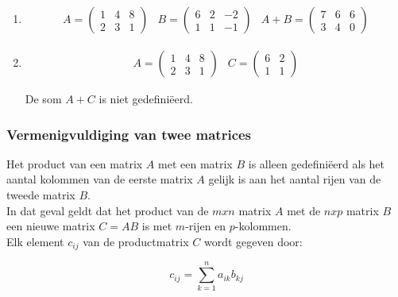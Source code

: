 \begin{enumerate}
	\item 
\[
\begin{array}{lll}
A= \left( \begin{matrix}
1 & 4 & 8 \\
2 & 3 & 1
\end{matrix} \right) &
B= \left( \begin{matrix}
6 & 2 & -2 \\
1 & 1 & -1 
\end{matrix} \right) &
A+B=\left( \begin{matrix}
7 & 6 & 6 \\
3 & 4 & 0
\end{matrix} \right)
\end{array}
\]
	\item
\[ 
\begin{array}{ll}
A= \left( \begin{matrix}
1 & 4 & 8 \\
2 & 3 & 1
\end{matrix} \right) &
C= \left( \begin{matrix}
6 & 2 \\
1 & 1  
\end{matrix} \right)
\end{array}
\]

De som $A+C$ is niet gedefini\"{e}erd.
\end{enumerate}

\subsubsection{Vermenigvuldiging van twee matrices}

Het product van een matrix $A$ met een matrix $B$ is alleen gedefini\"{e}erd als het aantal kolommen van de eerste matrix $A$ gelijk is aan het aantal rijen van de tweede matrix $B$.\\

In dat geval geldt dat het product van de $mxn$ matrix $A$ met de $nxp$ matrix $B$ een nieuwe matrix $C=AB$ is met $m$-rijen en $p$-kolommen.\\
Elk element $c_{ij}$ van de productmatrix $C$ wordt gegeven door:

\begin{framed}

\[ c_{ij}=\sum\limits_{k=1}^{n} a_{ik}b_{kj}    \]

\end{framed}

